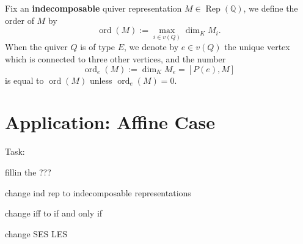 \documentclass[reqno,11pt]{amsart}
\numberwithin{equation}{section}
\theoremstyle{plain}
\theoremstyle{plain}
\numberwithin{equation}{section}
\theoremstyle{remark}
\DeclareMathOperator{\Rep}{\operatorname{Rep}}
\newcommand{\ord}{\operatorname{ord}}
\newcommand{\orde}{\operatorname{ord}_e }
\begin{document}
Fix an \textbf{indecomposable} quiver representation $M \in \Rep(\mathbb{Q})$, we define the order of $M$ by
$$\ord(M):= \max_{i \in v(Q)} \dim_K M_i.$$
When the quiver $Q$ is of type $E$, we denote by $e \in v(Q)$ the unique vertex which is connected to three other vertices, and the number 
$$\orde(M):=\dim_K M_e=[P(e),M]$$
is equal to $\ord(M)$ unless $\orde(M)=0$.


\section{Application: Affine Case}



Task:


fillin the ???

change ind rep to indecomposable representations

change iff to if and only if

change SES LES



\nocite{irelli2019cell}
\nocite{maksimau2019flag}
\end{document}

